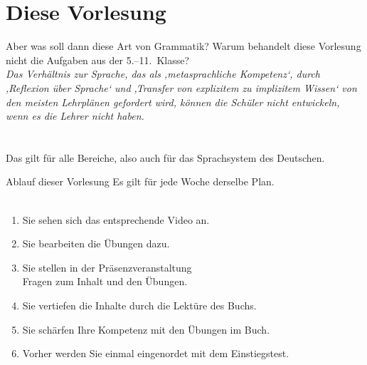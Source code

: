 \section{Diese Vorlesung}

\begin{frame}
  {Aber was soll dann diese Art von Grammatik?}
  \onslide<+->
  \onslide<+->
  \alert{Warum behandelt diese Vorlesung nicht die Aufgaben aus der 5.--11.~Klasse?}\\
  \onslide<+->
  \Zeile
  \textit{Das Verhältnis zur Sprache, das als ‚metasprachliche Kompetenz‘, durch ‚Reflexion über Sprache‘ und ‚Transfer von explizitem zu implizitem Wissen‘ von den meisten Lehrplänen gefordert wird, können die Schüler nicht entwickeln, wenn es die Lehrer nicht haben.}\\
  \Viertelzeile
  \\
  \Doppelzeile 
  \centering
  \onslide<+->
  \\
  \Viertelzeile
  \onslide<+->
  \alert{Das gilt für alle Bereiche, also auch für das Sprachsystem des Deutschen.}
\end{frame}

\begin{frame}
  {Ablauf dieser Vorlesung}
  \onslide<+->
  \onslide<+->
  Es gilt für jede Woche derselbe Plan.\\
  \\
  \Zeile
  \begin{enumerate}[<+->]\Large
    \item Sie sehen sich das entsprechende \alert{Video} an.
    \item Sie bearbeiten die \alert{Übungen} dazu.
    \item Sie stellen in der Präsenzveranstaltung\\
      \alert{Fragen zum Inhalt und den Übungen}.
    \item Sie vertiefen die Inhalte durch die \alert{Lektüre des Buchs}.
    \item Sie schärfen Ihre Kompetenz mit den \alert{Übungen im Buch}.
      \Halbzeile
    \item[ ] Vorher werden Sie einmal eingenordet mit dem \alert{Einstiegstest}.
  \end{enumerate}
\end{frame}

